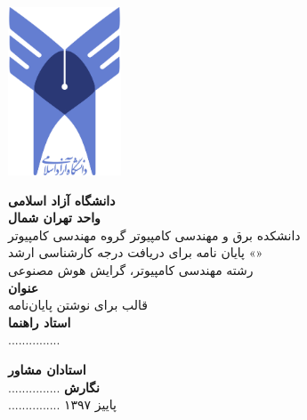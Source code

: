 \thispagestyle{empty}

\centerline{\includegraphics[height=5cm]{figs/logo.png}}

\begin{center}
\vspace{0.5cm}

\textbf{دانشگاه آزاد اسلامی}
\\[.2cm]
\textbf{واحد تهران شمال}
\\[0.5cm]

دانشکده برق و مهندسی کامپیوتر گروه مهندسی کامپیوتر
\\[.5cm]
پایان نامه برای دریافت درجه کارشناسی ارشد «»
\\[.2cm]
رشته مهندسی کامپیوتر، گرایش هوش مصنوعی
\\[0.5cm]

{\Large
\textbf{عنوان}
}
\\
قالب  برای نوشتن پایان‌نامه
\\[0.5cm]

{\Large
	\textbf{استاد راهنما}
}
\\
...............
\vskip 0.5cm

{\Large
	\textbf{استادان مشاور}
}
\\
...............
\vskip 0.5cm
{\Large
	\textbf{نگارش}
}
\\
...............
\vskip 0.5cm
پاییز ۱۳۹۷
\end{center}